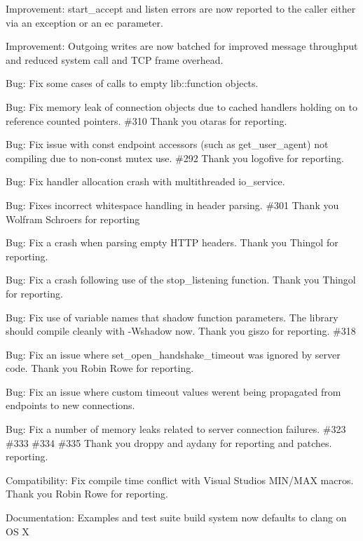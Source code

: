 \begin{DoxyItemize}
\item Improvement\+: {\ttfamily start\+\_\+accept} and {\ttfamily listen} errors are now reported to the caller either via an exception or an ec parameter.
\item Improvement\+: Outgoing writes are now batched for improved message throughput and reduced system call and TCP frame overhead.
\item Bug\+: Fix some cases of calls to empty lib\+::function objects.
\item Bug\+: Fix memory leak of connection objects due to cached handlers holding on to reference counted pointers. \#310 Thank you otaras for reporting.
\item Bug\+: Fix issue with const endpoint accessors (such as {\ttfamily get\+\_\+user\+\_\+agent}) not compiling due to non-\/const mutex use. \#292 Thank you logofive for reporting.
\item Bug\+: Fix handler allocation crash with multithreaded {\ttfamily io\+\_\+service}.
\item Bug\+: Fixes incorrect whitespace handling in header parsing. \#301 Thank you Wolfram Schroers for reporting
\item Bug\+: Fix a crash when parsing empty HTTP headers. Thank you Thingol for reporting.
\item Bug\+: Fix a crash following use of the {\ttfamily stop\+\_\+listening} function. Thank you Thingol for reporting.
\item Bug\+: Fix use of variable names that shadow function parameters. The library should compile cleanly with -\/Wshadow now. Thank you giszo for reporting. \#318
\item Bug\+: Fix an issue where {\ttfamily set\+\_\+open\+\_\+handshake\+\_\+timeout} was ignored by server code. Thank you Robin Rowe for reporting.
\item Bug\+: Fix an issue where custom timeout values weren\textquotesingle{}t being propagated from endpoints to new connections.
\item Bug\+: Fix a number of memory leaks related to server connection failures. \#323 \#333 \#334 \#335 Thank you droppy and aydany for reporting and patches. reporting.
\item Compatibility\+: Fix compile time conflict with Visual Studio\textquotesingle{}s MIN/\+MAX macros. Thank you Robin Rowe for reporting.
\item Documentation\+: Examples and test suite build system now defaults to clang on OS X
\end{DoxyItemize}

